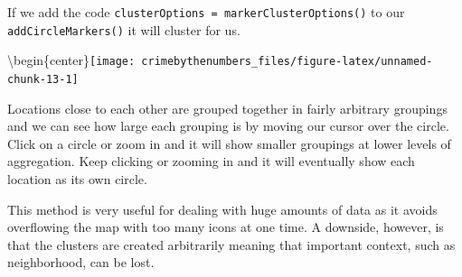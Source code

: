 \documentclass[
  12pt,
]{book}
\newenvironment{Shaded}{\begin{snugshade}}{\end{snugshade}}
\newcommand{\DataTypeTok}[1]{\textcolor[rgb]{0.27,0.27,0.27}{#1}}
\newcommand{\DecValTok}[1]{\textcolor[rgb]{0.06,0.06,0.06}{#1}}
\newcommand{\KeywordTok}[1]{\textcolor[rgb]{0.27,0.27,0.27}{\textbf{#1}}}
\newcommand{\NormalTok}[1]{#1}
\newcommand{\OperatorTok}[1]{\textcolor[rgb]{0.43,0.43,0.43}{\textbf{#1}}}
\newcommand{\StringTok}[1]{\textcolor[rgb]{0.5,0.5,0.5}{#1}}
\begin{document}
If we add the code \texttt{clusterOptions\ =\ markerClusterOptions()} to our \texttt{addCircleMarkers()} it will cluster for us.

\begin{Shaded}
\end{Shaded}

\textbackslash begin\{center\}\texttt{[image: crimebythenumbers\_files/figure-latex/unnamed-chunk-13-1]}

Locations close to each other are grouped together in fairly arbitrary groupings and we can see how large each grouping is by moving our cursor over the circle. Click on a circle or zoom in and it will show smaller groupings at lower levels of aggregation. Keep clicking or zooming in and it will eventually show each location as its own circle.

This method is very useful for dealing with huge amounts of data as it avoids overflowing the map with too many icons at one time. A downside, however, is that the clusters are created arbitrarily meaning that important context, such as neighborhood, can be lost.
\end{document}
